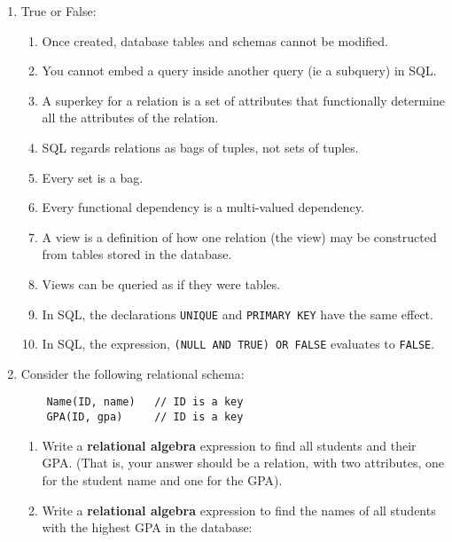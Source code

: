 {{\begin{enumerate}
    \item True or False: 
    \begin{enumerate}
        \item \underline{\hspace{.25in}} Once created, database tables
		and schemas cannot be modified.
        \item \underline{\hspace{.25in}} You cannot embed a query inside
		another query (ie a subquery) in SQL.
        \item \underline{\hspace{.25in}} A superkey for a relation is a
		set of attributes that functionally determine all the 
		attributes of the relation.
        \item \underline{\hspace{.25in}} SQL regards relations as bags
		of tuples, not sets of tuples.
        \item \underline{\hspace{.25in}} Every set is a bag.
        \item \underline{\hspace{.25in}} Every functional dependency is a 
		multi-valued dependency.
        \item \underline{\hspace{.25in}} A view is a definition of how
		one relation (the view) may be constructed from tables 
		stored in the database.
        \item \underline{\hspace{.25in}} Views can be queried as if
		they were tables.
        \item \underline{\hspace{.25in}} In SQL, the declarations
		{\tt UNIQUE} and {\tt PRIMARY KEY} have the same effect.
        \item \underline{\hspace{.25in}} In SQL, the expression,
		{\tt (NULL AND TRUE) OR FALSE} evaluates to {\tt FALSE}.
    \end{enumerate}


\item Consider the following relational schema:
\begin{verbatim}
    Name(ID, name)   // ID is a key
    GPA(ID, gpa)     // ID is a key
\end{verbatim}
\begin{enumerate}
    \item Write a {\bf relational algebra} expression to find all 
	students and their GPA.  (That is, your answer should be
	a relation, with two attributes, one for the student name
	and one for the GPA).
	\vspace{.5in}
    \item Write a {\bf relational algebra} expression to find the 
	names of all students with the highest GPA in the database:
	\vspace{1in}
\end{enumerate}


\end{enumerate}}}
